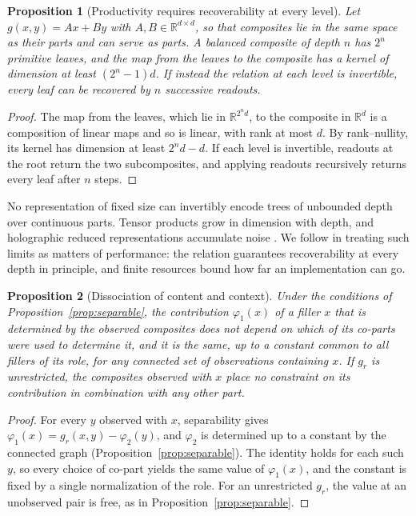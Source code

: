 \documentclass{article}
\theoremstyle{definition}
\theoremstyle{plain}
\newtheorem{proposition}{Proposition}
\theoremstyle{remark}
\newcommand{\R}{\mathbb{R}}
\begin{document}
\begin{proposition}[Productivity requires recoverability at every level]
\label{prop:depth}
Let $g(x, y) = Ax + By$ with $A, B \in \R^{d \times d}$, so that composites lie in the same space as their parts and can serve as parts. A balanced composite of depth $n$ has $2^n$ primitive leaves, and the map from the leaves to the composite has a kernel of dimension at least $(2^n - 1)d$. If instead the relation at each level is invertible, every leaf can be recovered by $n$ successive readouts.
\end{proposition}

\begin{proof}
The map from the leaves, which lie in $\R^{2^n d}$, to the composite in $\R^d$ is a composition of linear maps and so is linear, with rank at most $d$. By rank--nullity, its kernel has dimension at least $2^n d - d$. If each level is invertible, readouts at the root return the two subcomposites, and applying readouts recursively returns every leaf after $n$ steps.
\end{proof}

\noindent
No representation of fixed size can invertibly encode trees of
unbounded depth over continuous parts. Tensor products grow in
dimension with depth, and holographic reduced representations
accumulate noise \citep{smolensky1990,plate1995}. We follow
\citet{fodor1988} in treating such limits as matters of performance:
the relation guarantees recoverability at every depth in principle,
and finite resources bound how far an implementation can go.

\begin{proposition}[Dissociation of content and context]
\label{prop:context}
Under the conditions of Proposition~\ref{prop:separable}, the contribution $\varphi_1(x)$ of a filler $x$ that is determined by the observed composites does not depend on which of its co-parts were used to determine it, and it is the same, up to a constant common to all fillers of its role, for any connected set of observations containing $x$. If $g_r$ is unrestricted, the composites observed with $x$ place no constraint on its contribution in combination with any other part.
\end{proposition}

\begin{proof}
For every $y$ observed with $x$, separability gives $\varphi_1(x) = g_r(x, y) - \varphi_2(y)$, and $\varphi_2$ is determined up to a constant by the connected graph (Proposition~\ref{prop:separable}). The identity holds for each such $y$, so every choice of co-part yields the same value of $\varphi_1(x)$, and the constant is fixed by a single normalization of the role. For an unrestricted $g_r$, the value at an unobserved pair is free, as in Proposition~\ref{prop:separable}.
\end{proof}
\end{document}
